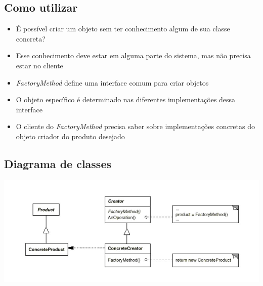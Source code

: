 \subsection{Como utilizar}
\label{sub:fac_utilizacao}

\begin{itemize}
	\item É possível criar um objeto sem ter conhecimento algum de sua classe concreta?
	\item Esse conhecimento deve estar em alguma parte do sistema, mas não precisa estar
no cliente
	\item \emph{FactoryMethod} define uma interface comum para criar objetos
	\item O objeto específico é determinado nas diferentes implementações dessa interface
	\item O cliente do \emph{FactoryMethod} precisa saber sobre implementações concretas do
objeto criador do produto desejado

\end{itemize}


\subsection{Diagrama de classes}
\label{sub:fac_diagrama}

\begin{center}
	\includegraphics[scale=0.40]{Figuras/image2.jpg}
	\label{fig:diagrama2}
\end{center}


